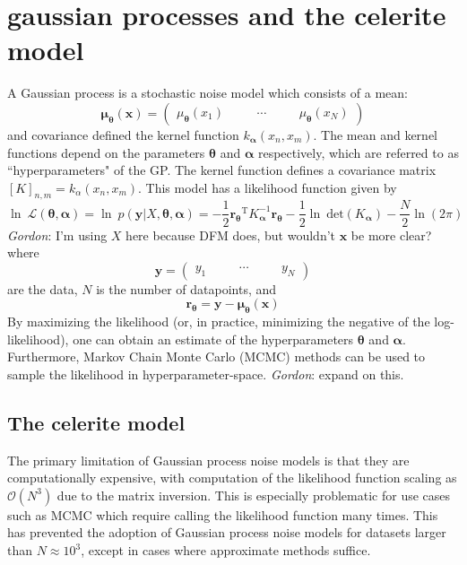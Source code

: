 \documentclass[modern]{aastex62}
\newcommand{\todo}[3]{{\color{#2}\emph{#1}: #3}}
\newcommand{\gordontodo}[1]{\todo{Gordon}{red}{#1}}
\newcommand{\project}[1]{\textsf{#1}}
\newcommand{\celerite}{\project{celerite }}
\newcommand{\bvec}[1]{{\ensuremath{\boldsymbol{#1}}}}
\newcommand{\T}{\ensuremath{\mathrm{T}}}
\newcommand{\expandvec}[2]{\left(\begin{array}{ccccc} #1\quad && \cdots\quad && #2 \end{array}\right)}
\begin{document}
\section{gaussian processes and the celerite model}
	A Gaussian process is a stochastic noise model which consists of a mean:
	\begin{equation} 
		\bvec{\mu_\theta}(\bvec{x}) = \expandvec{\mu_\bvec{\theta}(x_1)}{\mu_\bvec{\theta}(x_N)}
	\end{equation}
	and covariance defined the kernel function $k_\bvec{\alpha}(x_n, x_m)$. The mean and kernel functions depend on the parameters 
	$\bvec{\theta}$ and $\bvec{\alpha}$ respectively, which are referred to as ``hyperparameters" of the GP. The kernel function defines a covariance matrix 
	$\left[K\right]_{n, m} = k_\alpha(x_n, x_m)$. This model has a likelihood function given by
	\begin{equation}
		\ln\ \mathcal{L(\bvec{\theta}, \bvec{\alpha})} = \ln\ p(\bvec{y}|X, \bvec{\theta}, \bvec{\alpha}) = 
			-\frac{1}{2}\bvec{r_\theta}^\T K_\bvec{\alpha}^{-1}\bvec{r_\theta} 
			-\frac{1}{2}\ln\ \mathrm{det}(K_\bvec{\alpha}) - \frac{N}{2}\ln(2\pi)
	\end{equation}
	\gordontodo{I'm using $X$ here because DFM does, but wouldn't $\bvec{x}$ be more clear?}
	where 
	\begin{equation}
		\bvec{y} = \expandvec{y_1}{y_N}
	\end{equation}
	are the data, $N$ is the number of datapoints, and
	\begin{equation}
		\bvec{r_\theta} = \bvec{y}-\bvec{\mu_\theta}(\bvec{x})
	\end{equation}
	By maximizing the likelihood (or, in practice, minimizing the negative of the log-likelihood), one can obtain an estimate of the hyperparameters $\bvec{\theta}$ and 
	$\bvec{\alpha}$. Furthermore, Markov Chain Monte Carlo (MCMC) methods can be used to sample the likelihood in hyperparameter-space. \gordontodo{expand 
	on this.}
	\subsection{The \celerite model}
		The primary limitation of Gaussian process noise models is that they are computationally expensive, with computation of the likelihood function scaling as 
		$\mathcal{O}(N^3)$ due to the matrix inversion. This is especially problematic for use cases such as MCMC which require calling the likelihood function many 
		times. This has prevented the adoption of Gaussian process noise models for datasets larger than $N \approx 10^3$, except in cases where approximate 
		methods suffice. 
		
\end{document}
